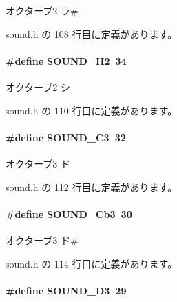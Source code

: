 オクターブ2 ラ\# 



 sound.\+h の 108 行目に定義があります。

\paragraph[{S\+O\+U\+N\+D\+\_\+\+H2}]{\setlength{\rightskip}{0pt plus 5cm}\#define S\+O\+U\+N\+D\+\_\+\+H2~34}\label{sound_8h_a8aeeeb1a420c4f8b23fe5c7960045a06_a8aeeeb1a420c4f8b23fe5c7960045a06}


オクターブ2 シ 



 sound.\+h の 110 行目に定義があります。

\paragraph[{S\+O\+U\+N\+D\+\_\+\+C3}]{\setlength{\rightskip}{0pt plus 5cm}\#define S\+O\+U\+N\+D\+\_\+\+C3~32}\label{sound_8h_a6cb42a0945d4a26b716ea357b265a8e4_a6cb42a0945d4a26b716ea357b265a8e4}


オクターブ3 ド 



 sound.\+h の 112 行目に定義があります。

\paragraph[{S\+O\+U\+N\+D\+\_\+\+Cb3}]{\setlength{\rightskip}{0pt plus 5cm}\#define S\+O\+U\+N\+D\+\_\+\+Cb3~30}\label{sound_8h_a3fbca825ab7829e2da07997cfb7be2b5_a3fbca825ab7829e2da07997cfb7be2b5}


オクターブ3 ド\# 



 sound.\+h の 114 行目に定義があります。

\paragraph[{S\+O\+U\+N\+D\+\_\+\+D3}]{\setlength{\rightskip}{0pt plus 5cm}\#define S\+O\+U\+N\+D\+\_\+\+D3~29}\label{sound_8h_ab0ffa43b4f3def70d822938a28983c90_ab0ffa43b4f3def70d822938a28983c90}


